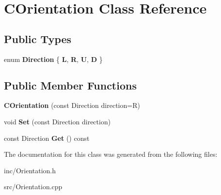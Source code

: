 \hypertarget{classCOrientation}{\section{C\-Orientation Class Reference}
\label{classCOrientation}
}
\subsection*{Public Types}
\begin{DoxyCompactItemize}
\item 
enum {\bfseries Direction} \{ {\bfseries L}, 
{\bfseries R}, 
{\bfseries U}, 
{\bfseries D}
 \}
\end{DoxyCompactItemize}
\subsection*{Public Member Functions}
\begin{DoxyCompactItemize}
\item 
\hypertarget{classCOrientation_a65116a9e6dc170a5d5690c3103fcf4a5}{{\bfseries C\-Orientation} (const Direction direction=R)}\label{classCOrientation_a65116a9e6dc170a5d5690c3103fcf4a5}

\item 
\hypertarget{classCOrientation_a505c222d112a1fc8c662955881fe5daa}{void {\bfseries Set} (const Direction direction)}\label{classCOrientation_a505c222d112a1fc8c662955881fe5daa}

\item 
\hypertarget{classCOrientation_a10e34c75395ce925cfb7ecf3e5c98adc}{const Direction {\bfseries Get} () const }\label{classCOrientation_a10e34c75395ce925cfb7ecf3e5c98adc}

\end{DoxyCompactItemize}


The documentation for this class was generated from the following files\-:\begin{DoxyCompactItemize}
\item 
inc/Orientation.\-h\item 
src/Orientation.\-cpp\end{DoxyCompactItemize}

